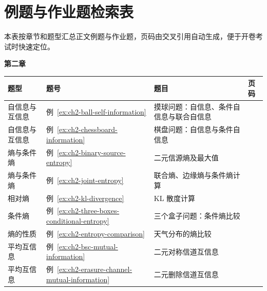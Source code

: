\cleardoublepage
{}
\section*{例题与作业题检索表}

本表按章节和题型汇总正文例题与作业题，页码由交叉引用自动生成，便于开卷考试时快速定位。

{\scriptsize
\renewcommand{\arraystretch}{1.18}

\noindent\textbf{第二章}\par
\begin{tabularx}{\textwidth}{@{}p{}p{}>{\raggedright\arraybackslash}X>{\raggedleft\arraybackslash}p{}@{}}
\toprule
\textbf{题型} & \textbf{题号} & \textbf{题目} & \textbf{页码} \\
\midrule
自信息与互信息 & 例~\ref{ex:ch2-ball-self-information} & 摸球问题：自信息、条件自信息与联合自信息 & \hyperref[ex:ch2-ball-self-information]{\pageref*{ex:ch2-ball-self-information}}  \\
自信息与互信息 & 例~\ref{ex:ch2-chessboard-information} & 棋盘问题：自信息与条件自信息 & \hyperref[ex:ch2-chessboard-information]{\pageref*{ex:ch2-chessboard-information}}  \\
熵与条件熵 & 例~\ref{ex:ch2-binary-source-entropy} & 二元信源熵及最大值 & \hyperref[ex:ch2-binary-source-entropy]{\pageref*{ex:ch2-binary-source-entropy}}  \\
熵与条件熵 & 例~\ref{ex:ch2-joint-entropy} & 联合熵、边缘熵与条件熵计算 & \hyperref[ex:ch2-joint-entropy]{\pageref*{ex:ch2-joint-entropy}}  \\
相对熵 & 例~\ref{ex:ch2-kl-divergence} & KL 散度计算 & \hyperref[ex:ch2-kl-divergence]{\pageref*{ex:ch2-kl-divergence}}  \\
条件熵 & 例~\ref{ex:ch2-three-boxes-conditional-entropy} & 三个盒子问题：条件熵比较 & \hyperref[ex:ch2-three-boxes-conditional-entropy]{\pageref*{ex:ch2-three-boxes-conditional-entropy}}  \\
熵的性质 & 例~\ref{ex:ch2-entropy-comparison} & 天气分布的熵比较 & \hyperref[ex:ch2-entropy-comparison]{\pageref*{ex:ch2-entropy-comparison}}  \\
平均互信息 & 例~\ref{ex:ch2-bsc-mutual-information} & 二元对称信道互信息 & \hyperref[ex:ch2-bsc-mutual-information]{\pageref*{ex:ch2-bsc-mutual-information}}  \\
平均互信息 & 例~\ref{ex:ch2-erasure-channel-mutual-information} & 二元删除信道互信息 & \hyperref[ex:ch2-erasure-channel-mutual-information]{\pageref*{ex:ch2-erasure-channel-mutual-information}}  \\

\end{tabularx}}
